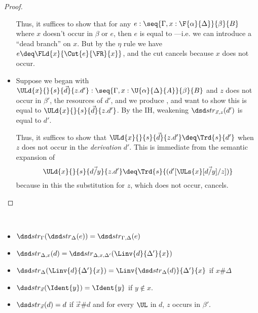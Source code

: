 \begin{proof}
\begin{itemize}
  Thus, it suffices to show that for any $e :
  \seq{\Gamma,x:\F{\alpha}{\Delta}}{\beta}{B}$ where $x$ doesn't occur
  in $\beta$ or $e$, then $e$ is equal to ---i.e. we
  can introduce a ``dead branch'' on $x$.  But by the $\eta$ rule we
  have $e \deq \FLd{x}{\Cut{e}{\FR}{x}}$, and the cut cancels
  because $x$ does not occur.
  
\item Suppose we began with $\ULd{x}{}{s}{\vec{d}}{z.d'} :
  \seq{\Gamma,x:\U{\alpha}{\Delta}{A}}{\beta}{B}$ and $z$ does not occur
  in $\beta'$, the resources of $d'$, and we produce
  , and want to show this is equal to
  $\ULd{x}{}{s}{\vec{d}}{z.d'}$.  By the IH, weakening
  $\str{\vec{x},z}{d'}$ is equal to $d'$.

  Thus, it suffices to show that $\ULd{x}{}{s}{\vec{d}}{z.d'} \deq
  \Trd{s}{d'}$ when $z$ does not occur in the \emph{derivation} $d'$.
  This is immediate from the semantic expansion of \UL{} 
  \[
  \ULd{x}{}{s}{\vec{d/y}}{z.d'} \deq \Trd{s}{(d'[\ULs{x}[\vec{d/y}]/z])}
  \]
  because in this the substitution for $z$, which does not occur,
  cancels.

\end{itemize}

\end{proof}



\begin{lemma} \label{lem:strengthening-eq-properties} ~ 
\begin{itemize}
\item $\str{\Gamma}{\str{\Delta}{e}} = \str{\Gamma,\Delta}{e}$
\item $\str{\Delta,x}{d} = \str{\Delta,x,\Delta'}{\Linv{d}{\Delta'}{x}}$
\item $\str{\Delta}{\Linv{d}{\Delta'}{x}} = \Linv{\str{\Delta}{d}}{\Delta'}{x}$ if $x \# \Delta$
\item $\str{\vec{x}}{\Ident{y}} = \Ident{y}$ if $y \not \in x$.  
\item $\str{\vec{x}}{d} = d$ if $\vec{x} \# d$ and for every $\UL$ in $d$,
  $z$ occurs in $\beta'$.    
\end{itemize}
\end{lemma}

